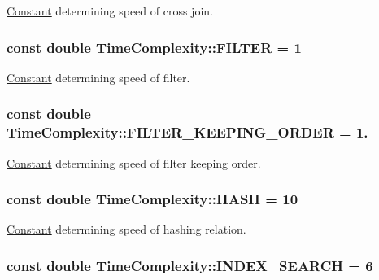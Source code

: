 \hyperlink{class_constant}{Constant} determining speed of cross join. \hypertarget{class_time_complexity_a4a30ee8b7f0778df1564a9c0baa259bd}{
\subsubsection[{F\+I\+L\+T\+E\+R}]{\setlength{\rightskip}{0pt plus 5cm}const double Time\+Complexity\+::\+F\+I\+L\+T\+E\+R = 1\hspace{0.3cm}{\ttfamily [static]}}}\label{class_time_complexity_a4a30ee8b7f0778df1564a9c0baa259bd}
\hyperlink{class_constant}{Constant} determining speed of filter. \hypertarget{class_time_complexity_a31c8e9e4ede24384d6dfc199d7dd1df6}{
\subsubsection[{F\+I\+L\+T\+E\+R\+\_\+\+K\+E\+E\+P\+I\+N\+G\+\_\+\+O\+R\+D\+E\+R}]{\setlength{\rightskip}{0pt plus 5cm}const double Time\+Complexity\+::\+F\+I\+L\+T\+E\+R\+\_\+\+K\+E\+E\+P\+I\+N\+G\+\_\+\+O\+R\+D\+E\+R = 1.\hspace{0.3cm}{\ttfamily [static]}}}\label{class_time_complexity_a31c8e9e4ede24384d6dfc199d7dd1df6}
\hyperlink{class_constant}{Constant} determining speed of filter keeping order. \hypertarget{class_time_complexity_a052631ae60c26ad4f0d840f012193898}{
\subsubsection[{H\+A\+S\+H}]{\setlength{\rightskip}{0pt plus 5cm}const double Time\+Complexity\+::\+H\+A\+S\+H = 10\hspace{0.3cm}{\ttfamily [static]}}}\label{class_time_complexity_a052631ae60c26ad4f0d840f012193898}
\hyperlink{class_constant}{Constant} determining speed of hashing relation. \hypertarget{class_time_complexity_ae8697720bb5788db90670f511073a606}{
\subsubsection[{I\+N\+D\+E\+X\+\_\+\+S\+E\+A\+R\+C\+H}]{\setlength{\rightskip}{0pt plus 5cm}const double Time\+Complexity\+::\+I\+N\+D\+E\+X\+\_\+\+S\+E\+A\+R\+C\+H = 6\hspace{0.3cm}{\ttfamily [static]}}}\label{class_time_complexity_ae8697720bb5788db90670f511073a606}
